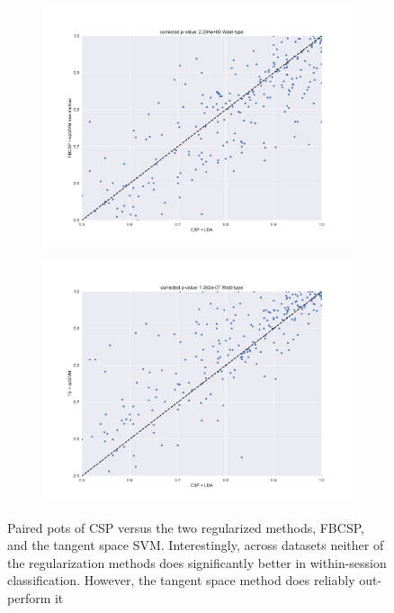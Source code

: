 \begin{figure}
\begin{subfigure}{0.475\textwidth}
        \includegraphics[width=\textwidth]{Figures/CSP3.pdf}
    \end{subfigure}
    \begin{subfigure}{0.475\textwidth}
        \includegraphics[width=\textwidth]{Figures/CSP4.pdf}
    \end{subfigure}
    \caption{Paired pots of CSP versus the two regularized methods, FBCSP, 
      and the tangent space SVM. Interestingly, across datasets
      neither of the regularization methods does significantly better
      in within-session classification. However, the tangent space
      method does reliably out-perform it}
    \label{fig:csp}
\end{figure}
